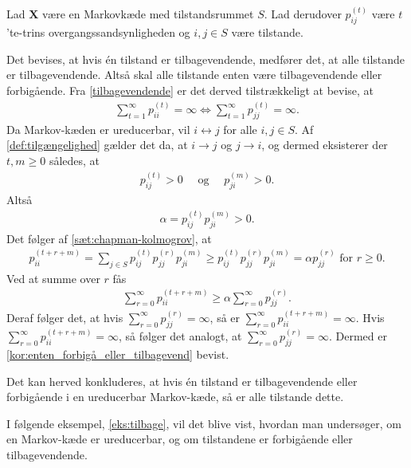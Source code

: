 \begin{bev} \textbf{} %
\newline
Lad $\bm X$ være en Markovkæde med tilstandsrummet $S$. Lad derudover $p_{ij}^{(t)}$ være $t$'te-trins overgangssandsynligheden og $i,j \in S$ være tilstande.

Det bevises, at hvis én tilstand er tilbagevendende, medfører det, at alle tilstande er tilbagevendende. Altså skal alle tilstande enten være tilbagevendende eller forbigående. Fra \autoref{tilbagevendende} er det derved tilstrækkeligt at bevise, at %
\begin{align*}
    \sum_{t=1}^\infty p_{ii}^{(t)}=\infty \Leftrightarrow  \sum_{t=1}^\infty p_{jj}^{(t)}=\infty.
\end{align*}
%
Da Markov-kæden er ureducerbar, vil $i \leftrightarrow j$ for alle $i,j \in S$. Af \autoref{def:tilgængelighed} gælder det da, at $i \to j$ og $j \to i$, og dermed eksisterer der $t,m\geq 0$ således, at
\begin{align*}
    p_{ij}^{(t)} > 0 \quad \text{ og } \quad p_{ji}^{(m)} > 0.
\end{align*}
Altså
\begin{align*}
    \alpha = p_{ij}^{(t)}p_{ji}^{(m)} > 0.
\end{align*}
Det følger af \autoref{sæt:chapman-kolmogrov}, at
\begin{align*}
    p_{ii}^{(t+r+m)} = \sum_{j \in S} p_{ij}^{(t)} p_{jj}^{(r)}p_{ji}^{(m)} \geq p_{ij}^{(t)} p_{jj}^{(r)}p_{ji}^{(m)} = \alpha p_{jj}^{(r)} \text{ for } r \geq 0.
\end{align*}
Ved at summe over $r$ fås
\begin{align*}
    \sum_{r=0}^\infty p_{ii}^{(t+r+m)} \geq \alpha \sum_{r=0}^\infty p_{jj}^{(r)}.
\end{align*}
Deraf følger det, at hvis $\displaystyle\sum_{r=0}^\infty p_{jj}^{(r)}= \infty$, så er $\displaystyle\sum_{r=0}^\infty p_{ii}^{(t+r+m)} = \infty$. Hvis $\displaystyle\sum_{r=0}^\infty p_{ii}^{(t+r+m)} = \infty$, så følger det analogt, at $\displaystyle\sum_{r=0}^\infty p_{jj}^{(r)}= \infty$. Dermed er \autoref{kor:enten_forbigå_eller_tilbagevend} bevist.
\end{bev}

Det kan herved konkluderes, at hvis én tilstand er tilbagevendende eller forbigående i en ureducerbar Markov-kæde, så er alle tilstande dette.

I følgende eksempel, \autoref{eks:tilbage}, vil det blive vist, hvordan man undersøger, om en Markov-kæde er ureducerbar, og om tilstandene er forbigående eller tilbagevendende.

